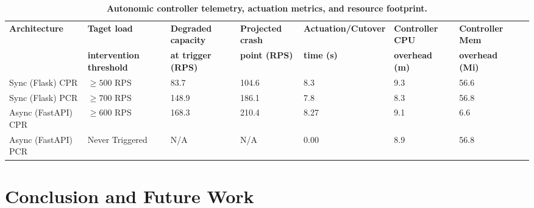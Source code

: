 \documentclass{ieeeaccess}
\begin{document}
\begin{table}[htbp]
	\centering
	\caption{\textbf{Autonomic controller telemetry, actuation metrics, and resource footprint.}}
	\label{tab:ctr-tele}
	\setlength{\tabcolsep}{3pt}
		\begin{tabular}{llllllll}
			\hline
			\textbf{Architecture}& \textbf{Taget load}& \textbf{Degraded capacity}& \textbf{Projected crash}& \textbf{Actuation/Cutover}& \textbf{Controller CPU}& \textbf{Controller Mem}\\
			
			& \textbf{intervention threshold}& \textbf{at trigger (RPS)}& \textbf{point (RPS)}& \textbf{time (s)}& \textbf{overhead (m)}& \textbf{overhead (Mi)}\\
			
			\hline
			
			Sync (Flask) CPR    & $\ge 500$ RPS & 83.7  & 104.6  & 8.3  & 9.3  & 56.6 \\
			Sync (Flask) PCR    & $\ge 700$ RPS & 148.9 & 186.1  & 7.8  & 8.3  & 56.8\\
			\hline
			Async (FastAPI) CPR & $\ge 600$ RPS & 168.3 & 210.4  & 8.27  & 9.1 & 6.6 \\
			Async (FastAPI) PCR	& Never Triggered & N/A  & N/A     & 0.00  & 8.9  & 56.8\\
			\hline
		\end{tabular}
	\end{table}



\section{Conclusion and Future Work}
\label{sec6}
\end{document}
